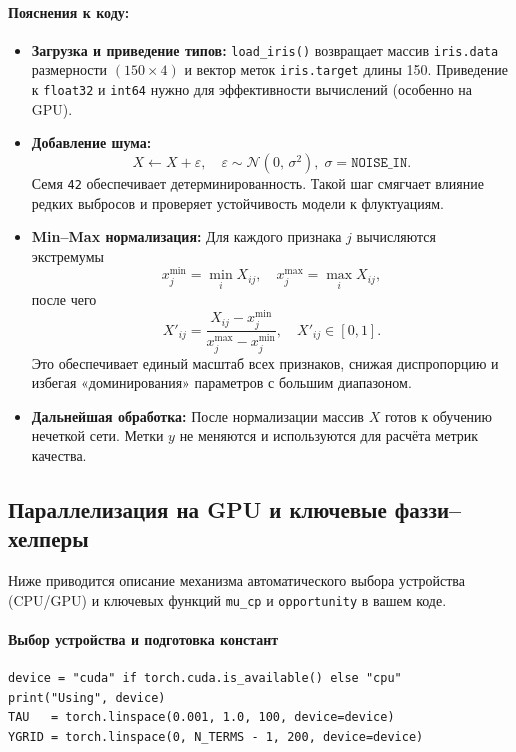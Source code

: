 \paragraph{Пояснения к коду:}
\begin{itemize}
  \item \textbf{Загрузка и приведение типов:}  
    \verb|load_iris()| возвращает массив \verb|iris.data| размерности $(150\times4)$ и вектор меток \verb|iris.target| длины 150.  
    Приведение к \verb|float32| и \verb|int64| нужно для эффективности вычислений (особенно на GPU).
  
  \item \textbf{Добавление шума:}
    \[
      X \leftarrow X + \varepsilon,\quad \varepsilon \sim \mathcal{N}(0,\,\sigma^2),\;
      \sigma=\texttt{NOISE\_IN}.
    \]
    Семя \verb|42| обеспечивает детерминированность. Такой шаг смягчает влияние редких выбросов и проверяет устойчивость модели к флуктуациям.
  
  \item \textbf{Min–Max нормализация:}  
    Для каждого признака $j$ вычисляются экстремумы
    \[
      x_j^{\min} = \min_i X_{ij}, \quad
      x_j^{\max} = \max_i X_{ij},
    \]
    после чего
    \[
      X'_{ij} = \frac{X_{ij} - x_j^{\min}}{x_j^{\max} - x_j^{\min}},\quad
      X'_{ij}\in[0,1].
    \]
    Это обеспечивает единый масштаб всех признаков, снижая диспропорцию и избегая «доминирования» параметров с большим диапазоном.
  
  \item \textbf{Дальнейшая обработка:}  
    После нормализации массив $X$ готов к обучению нечеткой сети. Метки $y$ не меняются и используются для расчёта метрик качества.
\end{itemize}

\subsection{Параллелизация на GPU и ключевые фаззи–хелперы}

Ниже приводится описание механизма автоматического выбора устройства (CPU/GPU) и ключевых функций \verb|mu_cp| и \verb|opportunity| в вашем коде.

\paragraph{Выбор устройства и подготовка констант}
\begin{verbatim}
device = "cuda" if torch.cuda.is_available() else "cpu"
print("Using", device)
TAU   = torch.linspace(0.001, 1.0, 100, device=device)
YGRID = torch.linspace(0, N_TERMS - 1, 200, device=device)
\end{verbatim}

